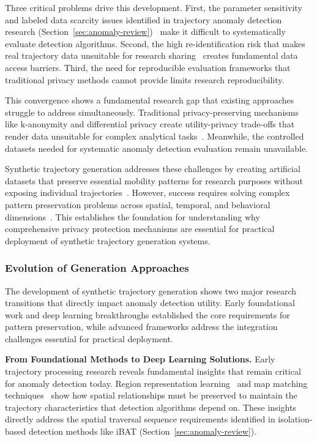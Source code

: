 \documentclass[runningheads]{llncs}
\begin{document}
Three critical problems drive this development. First, the parameter sensitivity and labeled data scarcity issues identified in trajectory anomaly detection research (Section~\ref{sec:anomaly-review})~\cite{zhang2019ibat} make it difficult to systematically evaluate detection algorithms. Second, the high re-identification risk that makes real trajectory data unsuitable for research sharing~\cite{rao2023cats} creates fundamental data access barriers. Third, the need for reproducible evaluation frameworks that traditional privacy methods cannot provide limits research reproducibility.

This convergence shows a fundamental research gap that existing approaches struggle to address simultaneously. Traditional privacy-preserving mechanisms like k-anonymity and differential privacy create utility-privacy trade-offs that render data unsuitable for complex analytical tasks~\cite{jordon2019pate}. Meanwhile, the controlled datasets needed for systematic anomaly detection evaluation remain unavailable.

Synthetic trajectory generation addresses these challenges by creating artificial datasets that preserve essential mobility patterns for research purposes without exposing individual trajectories~\cite{cao2021generating}. However, success requires solving complex pattern preservation problems across spatial, temporal, and behavioral dimensions~\cite{kong2023mobility,merhi2024synthetic}. This establishes the foundation for understanding why comprehensive privacy protection mechanisms are essential for practical deployment of synthetic trajectory generation systems.

\subsubsection{Evolution of Generation Approaches}

The development of synthetic trajectory generation shows two major research transitions that directly impact anomaly detection utility. Early foundational work and deep learning breakthroughs established the core requirements for pattern preservation, while advanced frameworks address the integration challenges essential for practical deployment.

\textbf{From Foundational Methods to Deep Learning Solutions.} Early trajectory processing research reveals fundamental insights that remain critical for anomaly detection today. Region representation learning~\cite{wang2017region} and map matching techniques~\cite{newson2009hidden} show how spatial relationships must be preserved to maintain the trajectory characteristics that detection algorithms depend on. These insights directly address the spatial traversal sequence requirements identified in isolation-based detection methods like iBAT (Section~\ref{sec:anomaly-review}).
\end{document}
